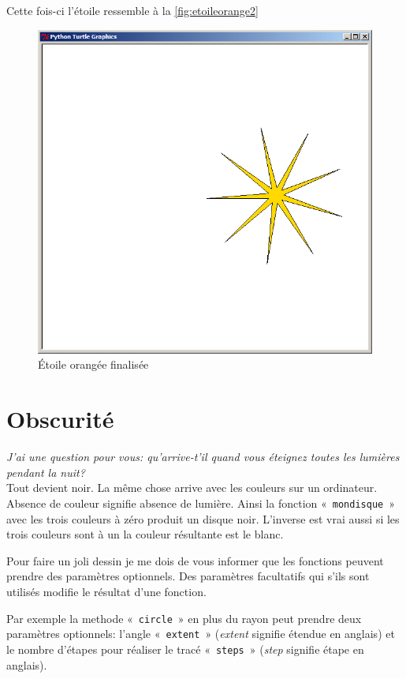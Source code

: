 Cette fois-ci l'étoile ressemble à la \autoref{fig:etoileorange2}
\begin{figure}[h!]
\centering
\includegraphics[scale=0.4]{images/etoileorange2}
\caption{Étoile orangée finalisée}\label{fig:etoileorange2}
\end{figure}

\section{Obscurité}

\emph{J'ai une question pour vous: qu'arrive-t'il quand vous éteignez toutes les lumières pendant la nuit?}\\

Tout devient noir. La même chose arrive avec les couleurs sur un ordinateur. Absence de couleur signifie absence de lumière. Ainsi la fonction «~\texttt{mondisque}~» avec les trois couleurs à zéro produit un disque noir. L'inverse est vrai aussi si les trois couleurs sont à un la couleur résultante est le blanc.

Pour faire un joli dessin je me dois de vous informer que les fonctions peuvent prendre des paramètres optionnels. Des paramètres facultatifs qui s'ils sont utilisés modifie le résultat d'une fonction.

Par exemple la methode «~\texttt{circle}~» en plus du rayon peut prendre deux paramètres optionnels: l'angle «~\texttt{extent}~» (\emph{extent} signifie étendue en anglais) et le nombre d'étapes pour réaliser le tracé «~\texttt{steps}~»   (\emph{step} signifie étape en anglais).

